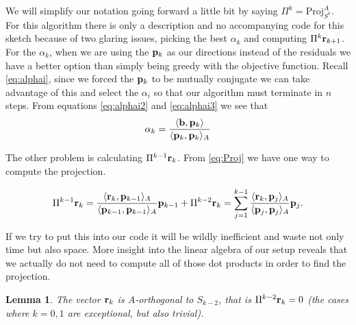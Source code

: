 \documentclass{article}
\newcommand{\bb}{{\bf b}}
\newcommand{\br}{{\bf r}}
\newcommand{\bp}{{\bf p}}
\newcommand{\beq}{\begin{equation}}
\newcommand{\eeq}{\end{equation}}
\newtheorem{lemma}{Lemma}[section]
\theoremstyle{remark}
\begin{document}
We will simplify our notation going forward a little bit by saying $\Pi^k  = \text{Proj}^A_{S^k}$. For this algorithm there is only a description and no accompanying code for this sketch because of two glaring issues, picking the best $\alpha_k$ and computing $\Pi^k\br_{k+1}$. For the $\alpha_k$,  when we are using the $\bp_k$ as our directions instead of the residuals we have a better option than simply being greedy with the objective function. Recall \eqref{eq:alphai}, since we forced the $\bp_k$ to be mutually conjugate we can take advantage of this and select the $\alpha_i$ so that our algorithm must terminate in $n$ steps. From equations \eqref{eq:alphai2} and \eqref{eq:alphai3} we see that 
\beq
\alpha_k = \frac{\langle \bb , \bp_k \rangle}{\langle \bp_k , \bp_k \rangle_A}
\eeq

The other problem is calculating $\Pi^{k-1}\br_k$. From \eqref{eq:Proj} we have one way to compute the projection. 

\beq
\label{eq:pik1}
\Pi^{k-1}\br_k = \frac{\langle \br_k , \bp_{k-1}\rangle_A}{\langle \bp_{k-1}, \bp_{k-1}\rangle_A}\bp_{k-1} + \Pi^{k-2}\br_k = \sum_{j=1}^{k-1}\frac{\langle \br_k , \bp_j\rangle_A}{\langle \bp_j, \bp_j\rangle_A}\bp_j.
\eeq

If we try to put this into our code it will be wildly inefficient and waste not only time but also space. More insight into the linear algebra of our setup reveals that we actually do not need to compute all of those dot products in order to find the projection. 

\begin{lemma}
\label{lem:magic}
The vector $\br_k$ is $A$-orthogonal to $S_{k-2}$, that is $\Pi^{k-2}\br_k = 0$ (the cases where $k = 0,1$ are exceptional, but also trivial).
\end{lemma}
\end{document}
